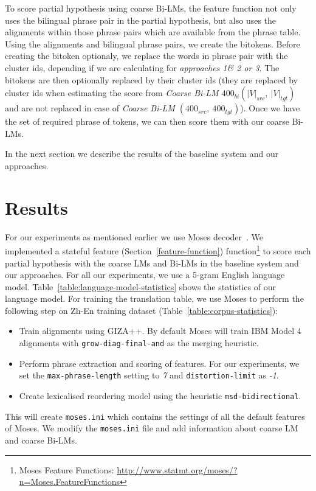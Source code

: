To score partial hypothesis using coarse Bi-LMs, the feature function not only uses the bilingual phrase pair in the partial hypothesis, but also uses the alignments within those phrase pairs which are available from the phrase table. Using the alignments and bilingual phrase pairs, we create the bitokens. Before creating the bitoken optionaly, we replace the words in phrase pair with the cluster ids, depending if we are calculating for \textit{approaches 1\& 2 or 3}. The bitokens are then optionally replaced by their cluster ids (they are replaced by cluster ids when estimating the score from \textit{Coarse Bi-LM $400_{bi}(|V|_{src},\ |V|_{tgt})$} and are not replaced in case of \textit{Coarse Bi-LM $(400_{src},\ 400_{tgt})$}). Once we have the set of required phrase of tokens, we can then score them with our coarse Bi-LMs.

In the next section we describe the results of the baseline system and our approaches.

\section{Results}

For our experiments as mentioned earlier we use Moses decoder~\cite{Koehn2007Moses}. We implemented a stateful feature (Section~\ref{feature-function}) function\footnote{Moses Feature Functions: \url{http://www.statmt.org/moses/?n=Moses.FeatureFunctions}} to score each partial hypothesis with the coarse LMs and Bi-LMs in the baseline system and our approaches. For all our experiments, we use a 5-gram English language model. Table~\ref{table:language-model-statistics} shows the statistics of our language model. For training the translation table, we use Moses to perform the following step on Zh-En training dataset (Table~\ref{table:corpus-statistics}):
\begin{itemize}
	\item Train alignments using GIZA++\cite{Och2003}. By default Moses will train IBM Model 4 alignments with \texttt{grow-diag-final-and} as the merging heuristic.
	\item Perform phrase extraction and scoring of features. For our experiments, we set the \texttt{max-phrase-length} setting to \textit{7} and \texttt{distortion-limit} as \textit{-1}.
	\item Create lexicalised reordering model using the heuristic \texttt{msd-bidirectional}.
\end{itemize}

This will create \texttt{moses.ini} which contains the settings of all the default features of Moses. We modify the \texttt{moses.ini} file and add information about coarse LM and coarse Bi-LMs.

